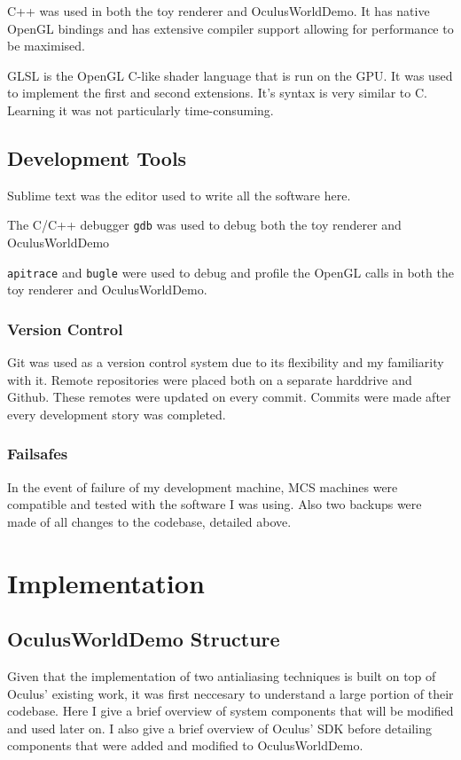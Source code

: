 \documentclass[12pt,a4paper,twoside,openright]{report}
\begin{document}
C++ was used in both the toy renderer and OculusWorldDemo. It has native OpenGL bindings and has extensive compiler support allowing for performance to be maximised.

GLSL is the OpenGL C-like shader language that is run on the GPU. It was used to implement the first and second extensions. It's syntax is very similar to C. Learning it was not particularly time-consuming.

\section{Development Tools}

Sublime text was the editor used to write all the software here.

The C/C++ debugger \texttt{gdb} was used to debug both the toy renderer and OculusWorldDemo

\texttt{apitrace} and \texttt{bugle} were used to debug and profile the OpenGL calls in both the toy renderer and OculusWorldDemo.

\subsection{Version Control}

Git was used as a version control system due to its flexibility and my familiarity with it. Remote repositories were placed both on a separate harddrive and Github. These remotes were updated on every commit. Commits were made after every development story was completed.

\subsection{Failsafes}

In the event of failure of my development machine, MCS machines were compatible and tested with the software I was using. Also two backups were made of all changes to the codebase, detailed above.

\chapter{Implementation}

\section{OculusWorldDemo Structure}

Given that the implementation of two antialiasing techniques is built on top of Oculus' existing work, it was first neccesary to understand a large portion of their codebase.
Here I give a brief overview of system components that will be modified and used later on. I also give a brief overview of Oculus' SDK before detailing components that were added and modified to OculusWorldDemo.
\end{document}
